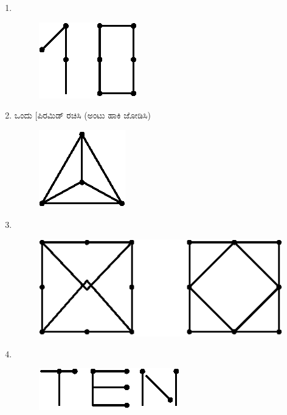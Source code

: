 \begin{enumerate}
\begin{figure}[H]
\hspace{4cm}
\end{figure}

\item 
~

\begin{figure}[H]
\centering
\includegraphics[scale=1.3]{images/chap12/ans9.eps}
\end{figure}

\eject

\item ಒಂದು [ಪಿರಮಿಡ್ ರಚಿಸಿ (ಅಂಟು ಹಾಕಿ ಜೋಡಿಸಿ)
\begin{figure}[H]
\centering
\includegraphics{images/chap12/ans10.eps}
\end{figure}


\item 
~

\begin{figure}[H]
\centering
\includegraphics{images/chap12/ans11.eps}
\end{figure}

\item 
~

\begin{figure}[H]
\centering
\includegraphics{images/chap12/ans12.eps}
\end{figure}


\end{enumerate}
